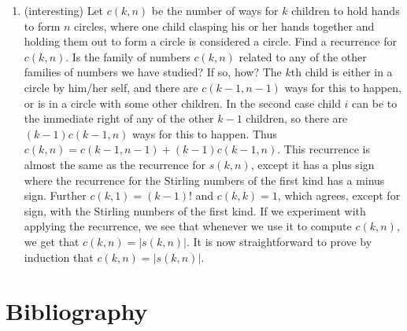 \documentclass[10pt,]{book}
\theoremstyle{plain}
\theoremstyle{definition}
\numberwithin{equation}{chapter}
\begin{document}
\begin{enumerate}
%
\item\hypertarget{li-37}{}(interesting) Let \(c(k,n)\) be the number of ways for \(k\) children to hold hands to form \(n\) circles, where one child clasping his or her hands together and holding them out to form a circle is considered a circle.  Find a recurrence for \(c(k,n)\).  Is the family of numbers \(c(k,n)\) related to any of the other families of numbers we have studied? If so, how? The \(k\)th child is either in a circle by him/her self, and there are \(c(k-1,n-1)\) ways for this to happen, or is in a circle with some other children. In the second case child \(i\) can be to the immediate right of any of the other \(k-1\) children, so there are \((k-1)c(k-1,n)\) ways for this to happen. Thus \(c(k,n)=c(k-1,n-1)
+(k-1)c(k-1,n)\). This recurrence is almost the same as the recurrence for \(s(k,n)\), except it has a plus sign where the recurrence for the Stirling numbers of the first kind has a minus sign. Further \(c(k,1)=(k-1)!\) and \(c(k,k)=1\), which agrees, except for sign, with the Stirling numbers of the first kind. If we experiment with applying the recurrence, we see that whenever we use it to compute \(c(k,n)\), we get that \(c(k,n)=|s(k,n)|\). It is now straightforward to prove by induction that \(c(k,n)=|s(k,n)|\).%
%
\end{enumerate}
%
\backmatter
%
%
%
\typeout{************************************************}
\typeout{************************************************}
\chapter[{Bibliography}]{Bibliography}\label{references-1}
%
\renewcommand{\leftmark}{Index}
\printindex
%
\end{document}
